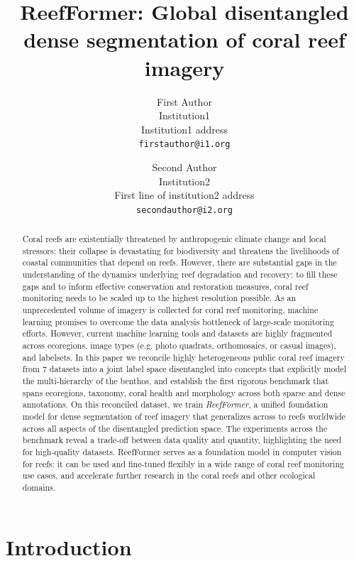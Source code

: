 \documentclass[10pt,twocolumn,letterpaper]{article}
\title{\textbf{ReefFormer:} Global disentangled dense segmentation of coral reef imagery %
}
\author{
First Author\\
Institution1\\
Institution1 address\\
{\tt\small firstauthor@i1.org}
\and
Second Author\\
Institution2\\
First line of institution2 address\\
{\tt\small secondauthor@i2.org}
}
\begin{document}
\maketitle
\begin{abstract}
Coral reefs are existentially threatened by anthropogenic climate change and local stressors: their collapse is devastating for biodiversity and threatens the livelihoods of coastal communities that depend on reefs. However, there are substantial gaps in the understanding of the dynamics underlying reef degradation and recovery: to fill these gaps and to inform effective conservation and restoration measures, coral reef monitoring needs to be scaled up to the highest resolution possible. As an unprecedented volume of imagery is collected for coral reef monitoring, machine learning promises to overcome the data analysis bottleneck of large-scale monitoring efforts.
However, current machine learning tools and datasets are highly fragmented across ecoregions, image types (e.g. photo quadrats, orthomosaics, or casual images), and labelsets. In this paper we reconcile highly heterogeneous public coral reef imagery from 7 datasets into a joint label space disentangled into concepts that explicitly model the multi-hierarchy of the benthos, and establish the first rigorous benchmark that spans ecoregions, taxonomy, coral health and morphology across both sparse and dense annotations. On this reconciled dataset, we train \emph{ReefFormer}, a unified foundation model for dense segmentation of reef imagery that generalizes across to reefs worldwide across all aspects of the disentangled prediction space. The experiments across the benchmark reveal a trade-off between data quality and quantity, highlighting the need for high-quality datasets. ReefFormer serves as a foundation model in computer vision for reefs: it can be used and fine-tuned flexibly in a wide range of coral reef monitoring use cases, and accelerate further research in the coral reefs and other ecological domains.
\end{abstract}


\section{Introduction}

\end{document}
